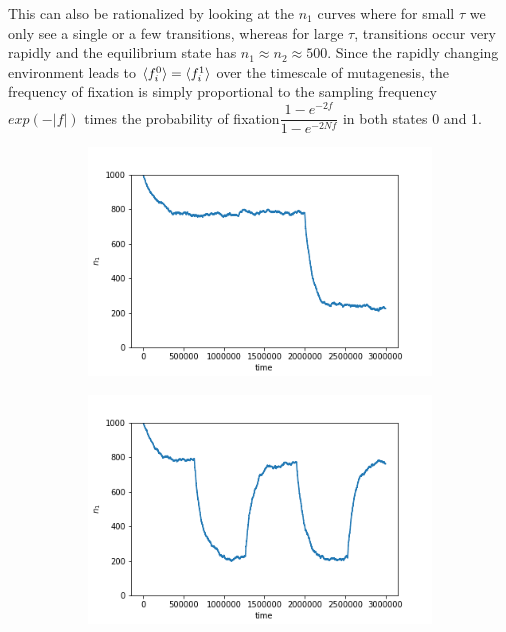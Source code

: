 \documentclass{article}
\begin{document}
This can also be rationalized by looking at the $n_1$ curves where for small $\tau$ we only see a single or a few transitions, whereas for large $\tau$, transitions occur very rapidly and the equilibrium state has $n_1 \approx n_2 \approx 500$. Since the rapidly changing environment leads to $\braket{f_i^0} = \braket{f_i^1}$ over the timescale of mutagenesis, the frequency of fixation is simply proportional to the sampling frequency $exp(-|f|)$ times the probability of fixation$ \dfrac{1- e^{-2 f}}{1- e^{-2 N f}}$ in both states 0 and 1.

\begin{figure}[h]
	\centering
	\begin{subfigure}[t]{0.305\linewidth}
		\centering
		\includegraphics[width = 1.0\linewidth, trim={5 5 40 30}, clip=true]{figures/tau5e7_selection_trajec.png}
		\label{fig:t7}	
	\end{subfigure}
	\hspace{0.03\linewidth}
	\begin{subfigure}[t]{0.305\linewidth}
		\centering
		\includegraphics[width = 1.0\linewidth, trim={5 5 40 30}, clip=true]{figures/tau5e5_selection_trajec.png}

\end{subfigure}
\end{figure}
\end{document}
